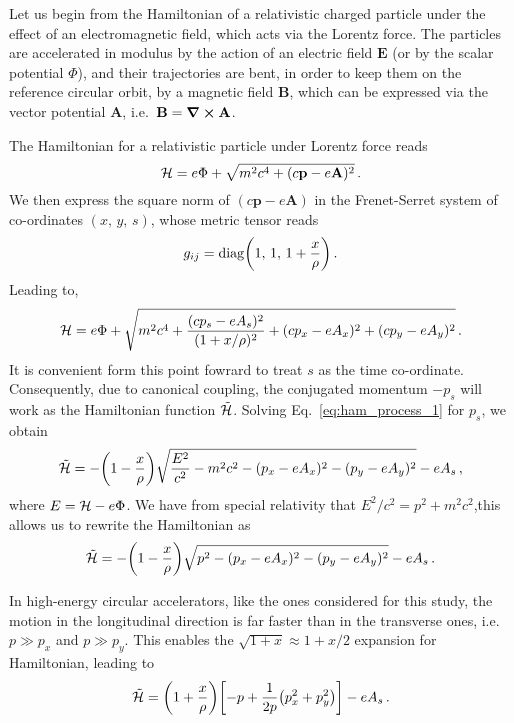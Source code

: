 Let us begin from the Hamiltonian of a relativistic charged particle under the effect of an electromagnetic field, which acts via the Lorentz force. The particles are accelerated in modulus by the action of an electric field $\mathbf{E}$ (or by the scalar potential $\Phi$), and their trajectories are bent, in order to keep them on the reference circular orbit, by a magnetic field $\mathbf{B}$, which can be expressed via the vector potential $\mathbf{A}$, i.e.\ $\mathbf{B}=\curl\mathbf{A}$.

The Hamiltonian for a relativistic particle under Lorentz force reads
%
\begin{equation}
    \mathcal{H} = e\Phi + \sqrt{ m^2c^4 + (c\mathbf{p}-e\mathbf{A})^2 }\,. 
\end{equation}
%
We then express the square norm of $(c\mathbf{p}-e\mathbf{A})$ in the Frenet-Serret system of co-ordinates $(x,\,y,\,s)$, whose metric tensor reads
%
\begin{equation} 
    g_{ij} = \mathrm{diag}\qty(1,\,1,\,1+\frac{x}{\rho})\,. 
\end{equation}
%
Leading to,
%
\begin{equation}
    \mathcal{H} = e\Phi + \sqrt{ m^2c^4 + \frac{(cp_s-eA_s)^2}{(1+x/\rho)^2 } + (cp_x-eA_x)^2+ (cp_y-eA_y)^2}\,.
    \label{eq:ham_process_1}
\end{equation}
%
It is convenient form this point fowrard to treat $s$ as the time co-ordinate. Consequently, due to canonical coupling, the conjugated momentum $-p_s$ will work as the Hamiltonian function $\tilde{\mathcal{H}}$. Solving Eq.~\eqref{eq:ham_process_1} for $p_s$, we obtain
%
\begin{equation} 
    \tilde{\mathcal{H}} = -\qty(1-\frac{x}{\rho})\sqrt{\frac{E^2}{c^2}-m^2c^2-(p_x-eA_x)^2-(p_y-eA_y)^2} - eA_s\,,
\end{equation}
%
where $E=\mathcal{H}-e\Phi$. We have from special relativity that $E^2/c^2 = p^2 + m^2c^2$,this allows us to rewrite the Hamiltonian as
\begin{equation}
    \tilde{\mathcal{H}} = -\qty(1-\frac{x}{\rho})\sqrt{p^2-(p_x-eA_x)^2-(p_y-eA_y)^2} - eA_s\,.
\end{equation}

In high-energy circular accelerators, like the ones considered for this study, the motion in the longitudinal direction is far faster than in the transverse ones, i.e.\ $p\gg p_x$ and $p\gg p_y$. This enables the $\sqrt{1+x}\approx 1+x/2$ expansion for Hamiltonian, leading to
%
\begin{equation} 
	\tilde{\mathcal{H}} = \qty(1+\frac{x}{\rho})\qty[-p + \frac{1}{2p}\qty(p_x^2+p_y^2)] -eA_s\,. 
	\label{eq:hamem}
\end{equation}

